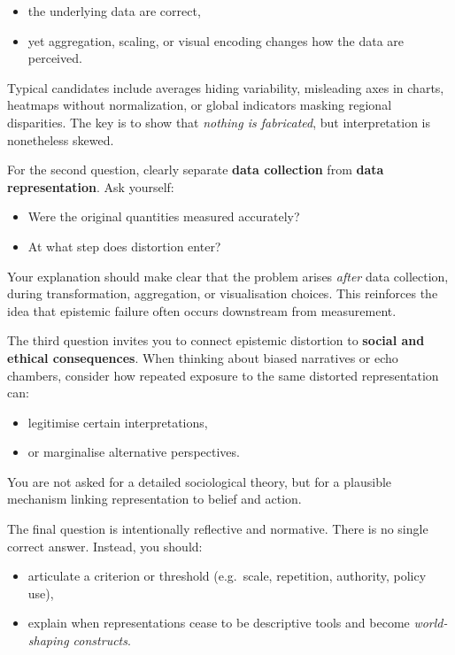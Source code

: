 \documentclass[
  12pt,
]{book}
\providecommand{\tightlist}{%
  \setlength{\itemsep}{0pt}\setlength{\parskip}{0pt}}
\begin{document}
\begin{itemize}
\tightlist
\item
  the underlying data are correct,
\item
  yet aggregation, scaling, or visual encoding changes how the data are perceived.
\end{itemize}

Typical candidates include averages hiding variability, misleading axes in charts, heatmaps without normalization, or global indicators masking regional disparities. The key is to show that \emph{nothing is fabricated}, but interpretation is nonetheless skewed.

For the second question, clearly separate \textbf{data collection} from \textbf{data representation}. Ask yourself:

\begin{itemize}
\tightlist
\item
  Were the original quantities measured accurately?
\item
  At what step does distortion enter?
\end{itemize}

Your explanation should make clear that the problem arises \emph{after} data collection, during transformation, aggregation, or visualisation choices. This reinforces the idea that epistemic failure often occurs downstream from measurement.

The third question invites you to connect epistemic distortion to \textbf{social and ethical consequences}. When thinking about biased narratives or echo chambers, consider how repeated exposure to the same distorted representation can:

\begin{itemize}
\tightlist
\item
  legitimise certain interpretations,
\item
  or marginalise alternative perspectives.
\end{itemize}

You are not asked for a detailed sociological theory, but for a plausible mechanism linking representation to belief and action.

The final question is intentionally reflective and normative. There is no single correct answer. Instead, you should:

\begin{itemize}
\tightlist
\item
  articulate a criterion or threshold (e.g.~scale, repetition, authority, policy use),
\item
  explain when representations cease to be descriptive tools and become \emph{world-shaping constructs}.
\end{itemize}
\end{document}

